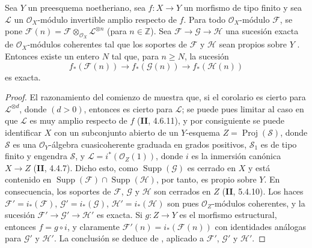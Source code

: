 
\begin{corollary}[2.2.4]
\label{III.2.2.4}
\label{III.2.2.4-fr}
Sea $Y$ un preesquema noetheriano, sea $f:X\to Y$ un morfismo de tipo finito y sea $\mathcal L$ un $\mathcal O_X$-módulo invertible amplio respecto de $f$.
Para todo $\mathcal O_X$-módulo $\mathcal F$, se pone
$\mathcal F(n)=\mathcal F\otimes_{\mathcal O_X}\mathcal L^{\otimes n}$
(para $n\in\mathbb Z$). Sea
$\mathcal F\to\mathcal G\to\mathcal H$
una sucesión exacta de $\mathcal O_X$-módulos coherentes tal que los soportes de $\mathcal F$ y $\mathcal H$ sean propios sobre $Y$ \textup{}.
Entonces existe un entero $N$ tal que, para $n\geq N$, la sucesión
\[
f_*(\mathcal F(n))\longrightarrow f_*(\mathcal G(n))
\longrightarrow f_*(\mathcal H(n))
\]
es exacta.
\end{corollary}

\begin{proof}
El razonamiento del comienzo de  muestra que, si el corolario es cierto para $\mathcal L^{\otimes d}$, donde $(d>0)$, entonces es cierto para $\mathcal L$; se puede pues limitar al caso en que $\mathcal L$ es muy amplio respecto de $f$ (\textbf{II}, 4.6.11), y por consiguiente se puede identificar $X$ con un subconjunto abierto de un $Y$-esquema
$Z=\operatorname{Proj}(\mathcal S)$,
donde $\mathcal S$ es una $\mathcal O_Y$-álgebra cuasicoherente graduada en grados positivos, $\mathcal S_1$ es de tipo finito y engendra $\mathcal S$, y
$\mathcal L=i^*(\mathcal O_Z(1))$, donde $i$ es la inmersión
canónica $X\to Z$ (\textbf{II}, 4.4.7). Dicho esto, como
$\operatorname{Supp}(\mathcal G)$ es cerrado en $X$ y está contenido en
$\operatorname{Supp}(\mathcal F)\cap\operatorname{Supp}(\mathcal H)$,
por tanto, es propio sobre $Y$.
En consecuencia, los soportes de $\mathcal F$, $\mathcal G$ y $\mathcal H$ son cerrados en $Z$ (\textbf{II}, 5.4.10). Los haces
$\mathcal F'=i_*(\mathcal F)$, $\mathcal G'=i_*(\mathcal G)$,
$\mathcal H'=i_*(\mathcal H)$ son pues $\mathcal O_Z$-módulos coherentes, y la sucesión
$\mathcal F'\to\mathcal G'\to\mathcal H'$
es exacta.
Si $g:Z\to Y$ es el morfismo estructural, entonces $f=g\circ i$, y claramente
$\mathcal F'(n)=i_*(\mathcal F(n))$
con identidades análogas para $\mathcal G'$ y $\mathcal H'$.
La conclusión se deduce de , aplicado a $\mathcal F'$, $\mathcal G'$ y $\mathcal H'$.
\end{proof}

